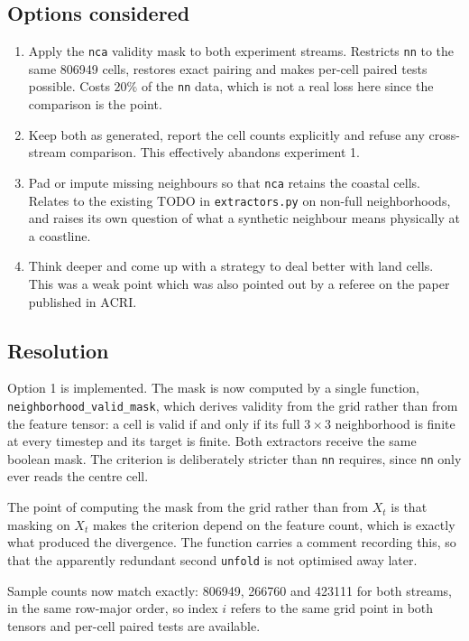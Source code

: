 \documentclass[11pt]{amsart}
\begin{document}
\subsection*{Options considered}
\begin{enumerate}
  \item Apply the \texttt{nca} validity mask to both experiment streams. Restricts
    \texttt{nn} to the same 806949 cells, restores exact pairing and makes
    per-cell paired tests possible. Costs $20\%$ of the \texttt{nn} data,
    which is not a real loss here since the comparison is the point.
  \item Keep both as generated, report the cell counts explicitly and refuse
    any cross-stream comparison. This effectively abandons experiment 1.
  \item Pad or impute missing neighbours so that \texttt{nca} retains the
    coastal cells. Relates to the existing TODO in \texttt{extractors.py} on
    non-full neighborhoods, and raises its own question of what a synthetic
    neighbour means physically at a coastline.
  \item Think deeper and come up with a strategy to deal better with land cells.
  This was a weak point which was also pointed out by a referee on the paper
  published in \(\mathrm{ACRI}\).
\end{enumerate}

\subsection*{Resolution}

Option 1 is implemented. The mask is now computed by a single function,
\texttt{neighborhood\_valid\_mask}, which derives validity from the grid rather
than from the feature tensor: a cell is valid if and only if its full
$3 \times 3$ neighborhood is finite at every timestep and its target is finite.
Both extractors receive the same boolean mask. The criterion is deliberately
stricter than \texttt{nn} requires, since \texttt{nn} only ever reads the centre
cell.

The point of computing the mask from the grid rather than from $X_t$ is that
masking on $X_t$ makes the criterion depend on the feature count, which is
exactly what produced the divergence. The function carries a comment recording
this, so that the apparently redundant second \texttt{unfold} is not optimised
away later.

Sample counts now match exactly: 806949, 266760 and 423111 for both streams,
in the same row-major order, so index $i$ refers to the same grid point in both
tensors and per-cell paired tests are available.
\end{document}
